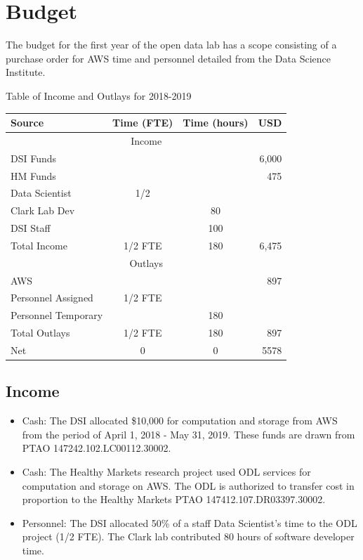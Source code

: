 \section{Budget} %
The budget for the first year of the open data lab has a scope consisting of a purchase order for AWS time and personnel detailed from the Data Science Institute.

\begin{center}
Table of Income and Outlays for 2018-2019

\begin{tabular}{lccr}
\hline
\hline
Source & Time (FTE) & Time (hours) & USD \\
\hline
\multicolumn{4}{c}{Income} \\
\hline
DSI Funds & && 6,000 \\
HM Funds & && 475 \\
Data Scientist & 1/2 & & \\
Clark Lab Dev & & 80 & \\
DSI Staff & & 100 & \\
\hline
Total Income & 1/2 FTE & 180 & 6,475 \\
\hline
\hline
\multicolumn{4}{c}{Outlays} \\
\hline
AWS & && 897 \\
Personnel Assigned & 1/2 FTE &  & \\
Personnel Temporary & & 180 & \\
\hline
Total Outlays & 1/2 FTE & 180 & 897 \\
\hline
\hline
Net & 0 & 0 & 5578 \\
\hline
\hline
\end{tabular}
\end{center}

\subsection{Income}
\begin{itemize}
\item Cash: The DSI allocated \$10,000 for computation and storage from AWS from the period of April 1, 2018 - May 31, 2019. These funds are drawn from PTAO 147242.102.LC00112.30002.
\item Cash: The Healthy Markets research project used ODL services for computation and storage on AWS. The ODL is authorized to transfer cost in proportion to the Healthy Markets PTAO 147412.107.DR03397.30002.
\item Personnel: The DSI allocated 50\% of a staff Data Scientist's time to the ODL project (1/2 FTE). The Clark lab contributed 80 hours of software developer time.
\end{itemize}

